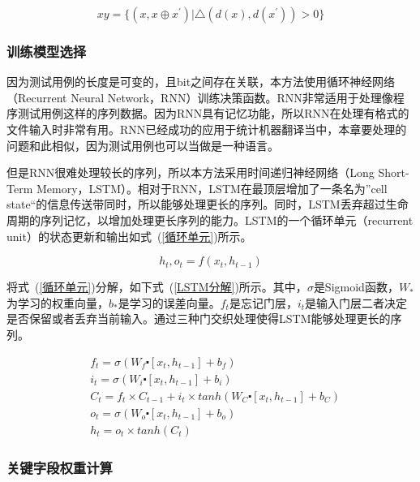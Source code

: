 \begin{equation}\label{训练集}
xy = \{(x, x \oplus x^{'}) | \bigtriangleup (d(x),d(x^{'})) > 0 \}
\end{equation}

\subsubsection{训练模型选择}

因为测试用例的长度是可变的，且bit之间存在关联，本方法使用循环神经网络（Recurrent Neural Network，RNN）训练决策函数。RNN非常适用于处理像程序测试用例这样的序列数据。因为RNN具有记忆功能，所以RNN在处理有格式的文件输入时非常有用。RNN已经成功的应用于统计机器翻译当中，本章要处理的问题和此相似，因为测试用例也可以当做是一种语言。

但是RNN很难处理较长的序列，所以本方法采用时间递归神经网络（Long Short-Term Memory，LSTM）。相对于RNN，LSTM在最顶层增加了一条名为”cell state“的信息传送带同时，所以能够处理更长的序列。同时，LSTM丢弃超过生命周期的序列记忆，以增加处理更长序列的能力。LSTM的一个循环单元（recurrent unit）的状态更新和输出如式~(\ref{循环单元})所示。

\begin{equation}\label{循环单元}
h_{t}, o_{t} = f(x_{t},h_{t-1})
\end{equation}

将式~(\ref{循环单元})分解，如下式~(\ref{LSTM分解})所示。其中，$\sigma$是Sigmoid函数，$W_{*}$为学习的权重向量，$b_{*}$是学习的误差向量。$f_t$是忘记门层，$i_t$是输入门层二者决定是否保留或者丢弃当前输入。通过三种门交织处理使得LSTM能够处理更长的序列。

\begin{equation}\label{LSTM分解}
\begin{aligned}
& f_{t} = \sigma(W_{f} \centerdot [x_{t}, h_{t-1}] + b_f) \\
& i_t = \sigma (W_{i} \centerdot [x_{t}, h_{t-1}] + b_{i}) \\
& C_{t} = f_{t} \times C_{t-1} + i_{t} \times tanh(W_C \centerdot [x_{t}, h_{t-1}] + b_{C}) \\
& o_t = \sigma(W_{o} \centerdot [x_{t}, h_{t-1}] + b_{o}) \\
& h_{t} = o_{t} \times tanh(C_{t})
\end{aligned}
\end{equation}

\subsubsection{关键字段权重计算}
\label{关键字段权重计算}

